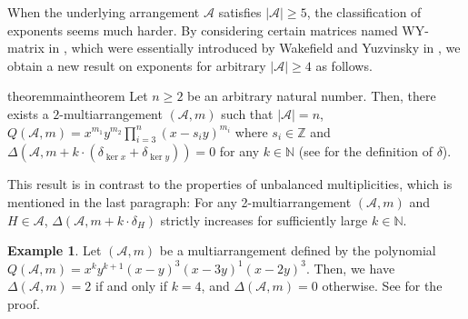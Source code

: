 \documentclass[12pt]{amsart}
\theoremstyle{definition}
\newtheorem{example}[definition]{Example}
\newcommand{\NN}{\mathbb{N}}
\newcommand{\ZZ}{\mathbb{Z}}
\newcommand{\AAA}{\mathcal{A}}
\newcommand{\blue}[1]{\textcolor{blue!80!black}{#1}}
\begin{document}
When %
the underlying arrangement $\AAA$ satisfies $|\AAA|\geq5$, 
the classification of exponents seems much harder. 
By considering certain matrices named WY-matrix in , 
which were essentially introduced by Wakefield and Yuzvinsky in \cite{Wakefield-Yuzvinsky}, 
we obtain a new result on exponents for arbitrary $|\AAA|\geq4$ as follows. 

\begin{restatable}{theorem}{maintheorem} 
\label{theorem:main theorem}
    Let $n\geq2$ be an arbitrary natural number. 
    Then, there exists a $2$-multiarrangement $(\AAA,m)$ such that 
    $|\AAA|=n$, 
    $Q(\AAA,m)=x^{m_1}y^{m_2}\prod_{i=3}^{n}(x-s_iy)^{m_i}$ where $s_i\in\ZZ$ 
    and 
    $\Delta(\AAA, m+k\cdot(\delta_{\ker x}+\delta_{\ker y}))=0$ for any $k\in\NN$ 
    (see  for the definition of $\delta$). 
\end{restatable}

This result is in contrast to the properties of unbalanced multiplicities, 
which is mentioned in the last paragraph: 
For any 2-multiarrangement $(\AAA,m)$ and $H\in\AAA$, 
$\Delta(\AAA,m+k\cdot\delta_H)$ strictly increases for sufficiently large $k\in\NN$. 
%
\begin{example}
    \label{example:45313}
    Let $(\AAA,m)$ be a multiarrangement 
    defined by the polynomial 
    $Q(\AAA,m)=x^{k}y^{k+1}(x-y)^{3}(x-3y)^{1}(x-2y)^{3}$. 
    Then, we have 
    $\Delta(\AAA,m)=2$ if and only if $k=4$, and 
    $\Delta(\AAA,m)=0$ otherwise. 
    See  for the proof. 
\end{example}
\end{document}
